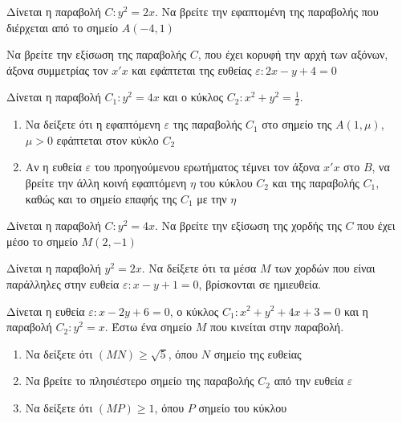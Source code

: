 \documentclass[greek]{beamer}
\begin{document}
\begin{askisi}
  Δίνεται η παραβολή $C:y^2=2x$. Να βρείτε την εφαπτομένη της παραβολής που διέρχεται από το σημείο $Α(-4,1)$


\end{askisi}

\begin{askisi}
  Να βρείτε την εξίσωση της παραβολής $C$, που έχει κορυφή την αρχή των αξόνων, άξονα συμμετρίας τον $x'x$ και εφάπτεται της ευθείας $ε:2x-y+4=0$


\end{askisi}

\begin{askisi}
  Δίνεται η παραβολή $C_1:y^2=4x$ και ο κύκλος $C_2:x^2+y^2=\frac{1}{2}$.
  \begin{enumerate}
    \item<1-> Να δείξετε ότι η εφαπτόμενη $ε$ της παραβολής $C_1$ στο σημείο της $Α(1,μ)$, $μ>0$ εφάπτεται στον κύκλο $C_2$
    \item<2-> Αν η ευθεία $ε$ του προηγούμενου ερωτήματος τέμνει τον άξονα $x'x$ στο $Β$, να βρείτε την άλλη κοινή εφαπτόμενη $η$ του κύκλου $C_2$ και της παραβολής $C_1$, καθώς και το σημείο επαφής της $C_1$ με την $η$
  \end{enumerate}


\end{askisi}

\begin{askisi}
  Δίνεται η παραβολή $C:y^2=4x$. Να βρείτε την εξίσωση της χορδής της $C$ που έχει μέσο το σημείο $Μ(2,-1)$


\end{askisi}

\begin{askisi}
  Δίνεται η παραβολή $y^2=2x$. Να δείξετε ότι τα μέσα $Μ$ των χορδών που είναι παράλληλες στην ευθεία $ε:x-y+1=0$, βρίσκονται σε ημιευθεία.


\end{askisi}

\begin{askisi}
  Δίνεται η ευθεία $ε:x-2y+6=0$, ο κύκλος $C_1:x^2+y^2+4x+3=0$ και η παραβολή $C_2:y^2=x$. Έστω ένα σημείο $Μ$ που κινείται στην παραβολή.
  \begin{enumerate}
    \item<1-> Να δείξετε ότι $(ΜΝ)\ge \sqrt{5}$, όπου $Ν$ σημείο της ευθείας
    \item<2-> Να βρείτε το πλησιέστερο σημείο της παραβολής $C_2$ από την ευθεία $ε$
    \item<3-> Να δείξετε ότι $(ΜΡ)\ge 1$, όπου $Ρ$ σημείο του κύκλου
  \end{enumerate}


\end{askisi}
\end{document}
